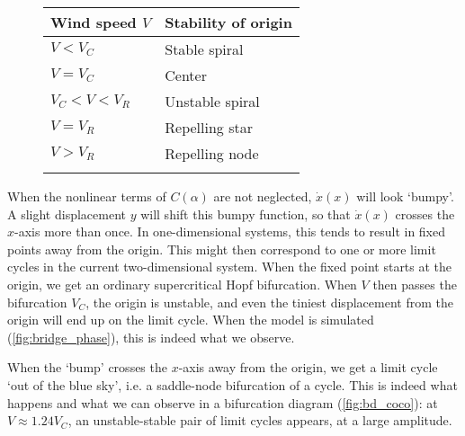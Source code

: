 \begin{figure}
\begin{minipage}[b]{0.6\textwidth}
\label{fig:eigencup}
\end{minipage}
\hfill
\begin{minipage}[b]{0.6\textwidth}
\centering
\begin{tabular}{@{}ll@{}} \toprule
Wind speed $V$    & Stability of origin \\
\midrule
$V < V_C$         & Stable spiral       \\[1em]
$V = V_C$         & Center              \\[1em]
$V_C < V < V_R $  & Unstable spiral     \\[1em]
$V = V_R$         & Repelling star      \\[1em]
$V > V_R$         & Repelling node      \\[1em]
\bottomrule
\vspace{26pt}
\end{tabular}
\label{tab:fp_class}
\vspace{26pt}
\end{minipage}
\end{figure}

When the nonlinear terms of $C(\alpha)$ are not neglected, $\dot{x}(x)$ will look `bumpy'. A slight displacement $y$ will shift this bumpy function, so that $\dot{x}(x)$ crosses the $x$-axis more than once. In one-dimensional systems, this tends to result in fixed points away from the origin. This might then correspond to one or more limit cycles in the current two-dimensional system. When the fixed point starts at the origin, we get an ordinary supercritical Hopf bifurcation. When $V$ then passes the bifurcation $V_C$, the origin is unstable, and even the tiniest displacement from the origin will end up on the limit cycle. When the model is simulated (\cref{fig:bridge_phase}), this is indeed what we observe.

When the `bump' crosses the $x$-axis away from the origin, we get a limit cycle `out of the blue sky', i.e. a saddle-node bifurcation of a cycle. This is indeed what happens and what we can observe in a bifurcation diagram (\cref{fig:bd_coco}): at $V \approx 1.24 V_C$, an unstable-stable pair of limit cycles appears, at a large amplitude.

